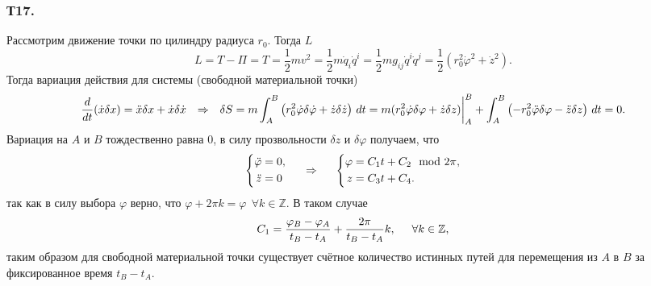 \subsubsection*{Т17.}

Рассмотрим движение точки по цилиндру радиуса $r_0$. Тогда $L$ 
\begin{equation*}
    L  = T - \Pi = T = \frac{1}{2} m v^2 = \frac{1}{2} m \dot{q}_i \dot{q}^i
    = \frac{1}{2} m g_{ij} \dot{q}^i \dot{q}^j
    = \frac{1}{2} \left(r_0^2 \dot{\varphi}^2 + \dot{z}^2\right)
    .
\end{equation*}
Тогда вариация действия для системы (свободной материальной точки)
\begin{equation*}
    \frac{d }{d t} (\dot{x} \delta x) = \ddot{x} \delta x + \dot{x} \delta \dot{x}
    \hspace{0.25cm} \Rightarrow \hspace{0.25cm} 
    \delta S =
    m \int_A^B 
    \left( 
        r_0^2 \dot{\varphi} \delta \dot{\varphi} + \dot{z} \delta \dot{z}
     \right)
    \, d t = 
    m (r_0^2 \dot{\varphi} \delta \varphi + \dot{z} \delta z)\bigg|_A^B
    + 
    \int_A^B 
    \left(
        -r_0^2 \ddot{\varphi} \delta \varphi - \ddot{z} \delta z
    \right) \, d t = 0.
\end{equation*}
Вариация на $A$ и $B$ тождественно равна 0, в силу прозвольности $\delta z$ и $\delta \varphi$ получаем, что
\begin{equation*}
    \left\{\begin{aligned}
        \ddot{\varphi} &= 0, \\
        \ddot{z} &= 0
    \end{aligned}\right.
    \hspace{0.5cm} \Rightarrow \hspace{0.5cm} 
    \left\{\begin{aligned}
        \varphi &= C_1 t + C_2 \mod 2 \pi, \\
        z &= C_3 t + C_4.
    \end{aligned}\right.
\end{equation*}
так как в силу выбора $\varphi$ верно, что $\varphi + 2 \pi k = \varphi \ \  \forall k \in \mathbb{Z}$. В таком случае
\begin{equation*}
    C_1 = \frac{\varphi_B - \varphi_A}{t_B - t_A} + \frac{2\pi}{t_B - t_A} k,
    \hspace{0.5cm} \forall k \in \mathbb{Z},
\end{equation*}
таким образом для свободной материальной точки существует счётное количество истинных путей для перемещения из $A$ в $B$ за фиксированное время $t_B - t_A$.
